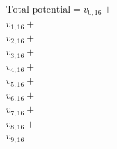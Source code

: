 \documentclass[preview]{standalone}
\begin{document}
\begin{align*}
\text{Total potential} = v_{0,16} + \\ v_{1,16} + \\ v_{2,16} + \\ v_{3,16} + \\ v_{4,16} + \\ v_{5,16} + \\ v_{6,16} + \\ v_{7,16} + \\ v_{8,16} + \\ v_{9,16}
\end{align*}
\end{document}
